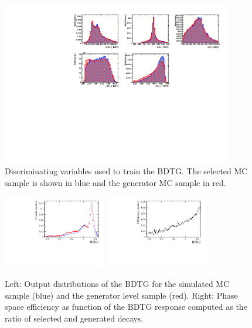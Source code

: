 \begin{figure}[h]
\centering
\includegraphics[height=!,width=0.9\textwidth]{figs/AcceptancePhspBDT/variables_id_c1.pdf}
\caption{Discriminating variables used to train the BDTG. The selected MC sample is shown in blue and the generator MC sample in red.}
\label{fig:varPhspBDT}
\end{figure}
\begin{figure}[h]
\centering
\includegraphics[height=!,width=0.4\textwidth]{figs/AcceptancePhspBDT/BDTG.pdf}
\includegraphics[height=!,width=0.4\textwidth]{figs/AcceptancePhspBDT/eff.pdf}
\caption{Left: Output distributions of the BDTG for the simulated MC sample (blue) and the generator level sample (red).
Right: Phase space efficiency as function of the BDTG response computed as the ratio of selected and generated decays.}
\label{fig:PhspBDT}
\end{figure}

